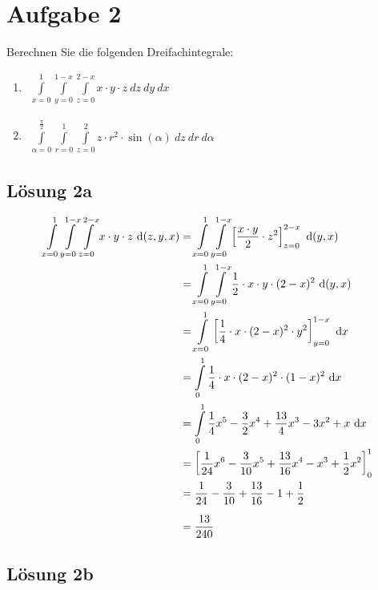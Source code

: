 \documentclass[main.tex]{subfiles}
\begin{document}
\section{Aufgabe 2}
Berechnen Sie die folgenden Dreifachintegrale:
\begin{enumerate}
\item 
$\begin{aligned}
\int \limits_{x=0}^{1} 
	\int \limits_{y=0}^{1-x} 
		\int \limits_{z=0}^{2-x} x \cdot y \cdot z \ dz \ dy \ dx
\end{aligned}$
\item 
$\begin{aligned}
\int \limits_{\alpha=0}^{\frac{\pi}{2}} 
	\int \limits_{r=0}^{1} 
		\int \limits_{z=0}^{2} 
			z \cdot r^2 \cdot \sin(\alpha) \ dz \ dr \ d\alpha
\end{aligned}$
\end{enumerate}

\subsection{Lösung 2a}

\begin{align*}
    \int \limits_{x=0}^{1} 
	\int \limits_{y=0}^{1-x} 
    \int \limits_{z=0}^{2-x} x \cdot y \cdot z ~\mathrm{d}(z,y,x)
 &= \int \limits_{x=0}^{1} 
    \int \limits_{y=0}^{1-x} 
    \left[ \frac{x \cdot y}{2} \cdot z^2 \right]_{z=0}^{2-x} ~\mathrm{d}(y,x) \\
 &= \int \limits_{x=0}^{1} 
    \int \limits_{y=0}^{1-x} 
    \frac{1}{2} \cdot x \cdot y \cdot (2-x)^2 ~\mathrm{d}(y,x) \\
 &= \int \limits_{x=0}^{1} 
    \left[ \frac{1}{4} \cdot x \cdot (2-x)^2 \cdot y^2 \right]_{y=0}^{1-x} ~\mathrm{d}x \\
 &= \int \limits_{0}^{1} \frac{1}{4} \cdot x \cdot (2-x)^2 \cdot (1-x)^2 ~\mathrm{d}x \\
 &= \int \limits_{0}^{1} \frac{1}{4} x^5 - \frac{3}{2} x^4 + \frac{13}{4} x^3 - 3 x^2 + x ~\mathrm{d}x \\
 &= \left[ \frac{1}{24} x^6 - \frac{3}{10} x^5 + \frac{13}{16} x^4 - x^3 + \frac{1}{2}x^2 \right]_{0}^{1} \\
 &= \frac{1}{24} - \frac{3}{10} + \frac{13}{16} - 1 + \frac{1}{2} \\[2mm]
 &= \frac{13}{240} \\
\end{align*}

\subsection{Lösung 2b}
\end{document}
